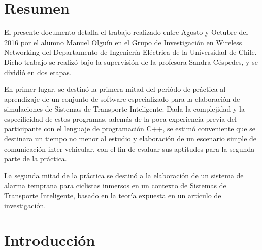 \documentclass[11pt,letterpaper]{article}
\begin{document}

\renewcommand{\sectionmark}[1]{\markright{\thesection.\ #1}}
\renewcommand{\headrulewidth}{0.5pt}
\renewcommand{\footrulewidth}{0.5pt}

%

\newpage
\section{Resumen}

El presente documento detalla el trabajo realizado entre Agosto y Octubre del 2016 por el alumno Manuel Olguín en el Grupo de Investigación en Wireless Networking del Departamento de Ingeniería Eléctrica de la Universidad de Chile. Dicho trabajo se realizó bajo la supervisión de la profesora Sandra Céspedes, y se dividió en dos etapas.

En primer lugar, se destinó la primera mitad del periódo de práctica al aprendizaje de un conjunto de software especializado para la elaboración de simulaciones de Sistemas de Transporte Inteligente. Dada la complejidad y la especificidad de estos programas, además de la poca experiencia previa del participante con el lenguaje de programación C++, se estimó conveniente que se destinara un tiempo no menor al estudio y elaboración de un escenario simple de comunicación inter-vehicular, con el fin de evaluar sus aptitudes para la segunda parte de la práctica.

La segunda mitad de la práctica se destinó a la elaboración de un sistema de alarma temprana para ciclistas inmersos en un contexto de Sistemas de Transporte Inteligente, basado en la teoría expuesta en un artículo de investigación.

\newpage

\tableofcontents
\listoffigures

\newpage
\section{Introducción}
\end{document}
